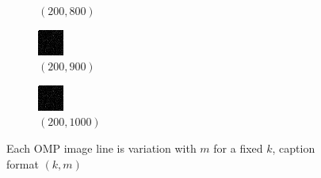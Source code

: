 \documentclass[a4paper, landscape]{article}
\begin{document}
\begin{figure}[H]
\begin{subfigure}{0.07\linewidth}
        \caption*{$(200, 800)$}
    \end{subfigure}
    \begin{subfigure}{0.07\linewidth}
        \centering
        \includegraphics[width=\linewidth]{omp/k = 200, m = 900.png}
        \caption*{$(200, 900)$}
    \end{subfigure}
    \begin{subfigure}{0.07\linewidth}
        \centering
        \includegraphics[width=\linewidth]{omp/k = 200, m = 1000.png}
        \caption*{$(200, 1000)$}
    \end{subfigure}
    \caption{Each OMP image line is variation with $m$ for a fixed $k$, caption format $(k, m)$}
    \label{fig:ok}
\end{figure}
\end{document}
